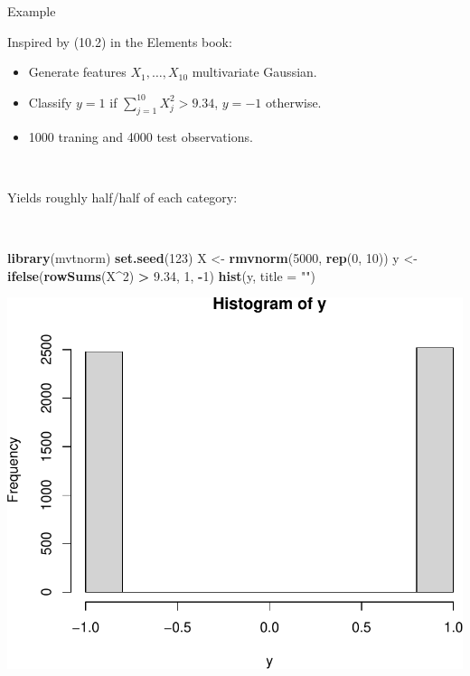 \documentclass[
  10pt,
  ignorenonframetext,
]{beamer}
\newenvironment{Shaded}{\begin{snugshade}}{\end{snugshade}}
\newcommand{\AttributeTok}[1]{\textcolor[rgb]{0.13,0.29,0.53}{#1}}
\newcommand{\DecValTok}[1]{\textcolor[rgb]{0.00,0.00,0.81}{#1}}
\newcommand{\FloatTok}[1]{\textcolor[rgb]{0.00,0.00,0.81}{#1}}
\newcommand{\FunctionTok}[1]{\textcolor[rgb]{0.13,0.29,0.53}{\textbf{#1}}}
\newcommand{\NormalTok}[1]{#1}
\newcommand{\OtherTok}[1]{\textcolor[rgb]{0.56,0.35,0.01}{#1}}
\newcommand{\SpecialCharTok}[1]{\textcolor[rgb]{0.81,0.36,0.00}{\textbf{#1}}}
\newcommand{\StringTok}[1]{\textcolor[rgb]{0.31,0.60,0.02}{#1}}
\providecommand{\tightlist}{%
  \setlength{\itemsep}{0pt}\setlength{\parskip}{0pt}}
\begin{document}
\begin{frame}[fragile]
\begin{block}{Example}
\protect\hypertarget{example}{}
\(~\)

Inspired by (10.2) in the Elements book:

\begin{itemize}
\tightlist
\item
  Generate features \(X_1, \ldots, X_{10}\) multivariate Gaussian.
\item
  Classify \(y=1\) if \(\sum_{j=1}^{10}X_j^2 > 9.34\), \(y=-1\)
  otherwise.
\item
  1000 traning and 4000 test observations.
\end{itemize}

\(~\)

Yields roughly half/half of each category:

\(~\)

\scriptsize
\centering

\begin{Shaded}
\begin{Highlighting}[]
\FunctionTok{library}\NormalTok{(mvtnorm)}
\FunctionTok{set.seed}\NormalTok{(}\DecValTok{123}\NormalTok{)}
\NormalTok{X }\OtherTok{\textless{}{-}} \FunctionTok{rmvnorm}\NormalTok{(}\DecValTok{5000}\NormalTok{, }\FunctionTok{rep}\NormalTok{(}\DecValTok{0}\NormalTok{, }\DecValTok{10}\NormalTok{))}
\NormalTok{y }\OtherTok{\textless{}{-}} \FunctionTok{ifelse}\NormalTok{(}\FunctionTok{rowSums}\NormalTok{(X}\SpecialCharTok{\^{}}\DecValTok{2}\NormalTok{) }\SpecialCharTok{\textgreater{}} \FloatTok{9.34}\NormalTok{, }\DecValTok{1}\NormalTok{, }\SpecialCharTok{{-}}\DecValTok{1}\NormalTok{)}
\FunctionTok{hist}\NormalTok{(y, }\AttributeTok{title =} \StringTok{""}\NormalTok{)}
\end{Highlighting}
\end{Shaded}

\includegraphics[width=0.4\linewidth]{9TreeBost_files/figure-beamer/unnamed-chunk-1-1}
\end{block}
\end{frame}
\end{document}
